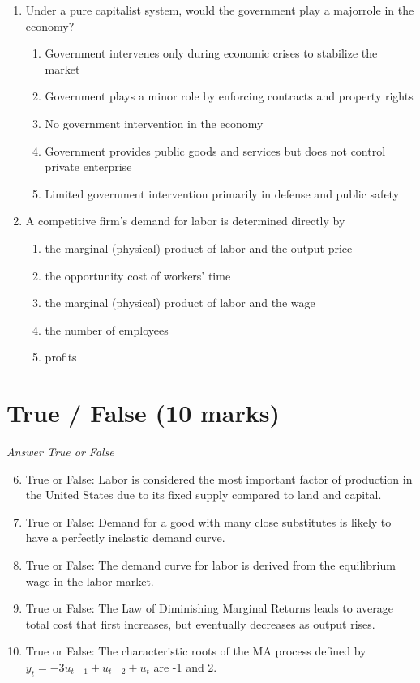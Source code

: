 \documentclass[12pt]{article}
\begin{document}
\begin{enumerate}[label=\arabic*.]
\begin{enumerate}[label=(\alph*)]
\end{enumerate}
\item Under a pure capitalist system, would the government play a majorrole in the economy?
\begin{enumerate}[label=(\alph*)]
    \item Government intervenes only during economic crises to stabilize the market
    \item Government plays a minor role by enforcing contracts and property rights
    \item No government intervention in the economy
    \item Government provides public goods and services but does not control private enterprise
    \item Limited government intervention primarily in defense and public safety
\end{enumerate}
\item A competitive firm's demand for labor is determined directly by
\begin{enumerate}[label=(\alph*)]
    \item the marginal (physical) product of labor and the output price
    \item the opportunity cost of workers' time
    \item the marginal (physical) product of labor and the wage
    \item the number of employees
    \item profits
\end{enumerate}
\end{enumerate}

\section*{True / False (10 marks)}
\textit{Answer True or False}
\begin{enumerate}[label=\arabic*.]
\setcounter{enumi}{5}
\item True or False: Labor is considered the most important factor of production in the United States due to its fixed supply compared to land and capital.
\item True or False: Demand for a good with many close substitutes is likely to have a perfectly inelastic demand curve.
\item True or False: The demand curve for labor is derived from the equilibrium wage in the labor market.
\item True or False: The Law of Diminishing Marginal Returns leads to average total cost that first increases, but eventually decreases as output rises.
\item True or False: The characteristic roots of the MA process defined by $y_t = -3u_{t-1} + u_{t-2} + u_{t}$ are -1 and 2.
\end{enumerate}
\end{document}
